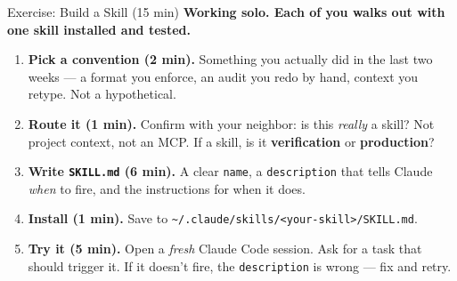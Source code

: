 \documentclass[aspectratio=169, 11pt]{beamer}
\begin{document}
\begin{frame}{Exercise: Build a Skill (15 min)}
  \textbf{Working solo. Each of you walks out with one skill installed and tested.}

  \vspace{0.5em}
  \begin{enumerate}
    \item \textbf{Pick a convention (2 min).} Something you actually did in the last two weeks --- a format you enforce, an audit you redo by hand, context you retype. Not a hypothetical.

    \vspace{0.2em}
    \item \textbf{Route it (1 min).} Confirm with your neighbor: is this \emph{really} a skill? Not project context, not an MCP. If a skill, is it \textbf{verification} or \textbf{production}?

    \vspace{0.2em}
    \item \textbf{Write \texttt{SKILL.md} (6 min).} A clear \texttt{name}, a \texttt{description} that tells Claude \emph{when} to fire, and the instructions for when it does.

    \vspace{0.2em}
    \item \textbf{Install (1 min).} Save to \texttt{\textasciitilde/.claude/skills/<your-skill>/SKILL.md}.

    \vspace{0.2em}
    \item \textbf{Try it (5 min).} Open a \emph{fresh} Claude Code session. Ask for a task that should trigger it. If it doesn't fire, the \texttt{description} is wrong --- fix and retry.
  \end{enumerate}
\end{frame}
\end{document}
